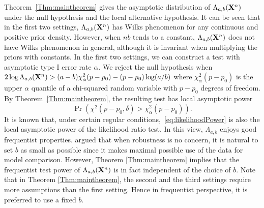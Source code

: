 \documentclass[11pt]{article}
\theoremstyle{plain}
\theoremstyle{definition}
\theoremstyle{remark}
\begin{document}
Theorem~\ref{Thm:maintheorem} gives the asymptotic distribution of $\Lambda_{a,b} (\mathbf{X}^n)$ under the null hypothesis and the local alternative hypothesis.
It can be seen that in the first two settings, $\Lambda_{a,b}(\mathbf{X}^n)$ has Wilks phenomenon for any continuous and positive prior density.
However, when $nb$ tends to a constant, $\Lambda_{a,b}(\mathbf{X}^n)$ does not have Wilks phenomenon in general, although it is invariant when multiplying the priors with constants.
In the first two settings, we can construct a test with asymptotic type I error rate $\alpha$.
We reject the null hypothesis when $ 2\log \Lambda_{a,b} (\mathbf{X}^n)>(a-b)\chi^2_{\alpha}(p-p_0)-(p-p_0)\log (a/b) $ where $\chi^2_{\alpha}(p-p_0)$ is the upper $\alpha$ quantile of a chi-squared random variable with $p-p_0$ degrees of freedom.
By Theorem~\ref{Thm:maintheorem}, the resulting test has local asymptotic power
\begin{equation}\label{eq:likelihoodPower}
\Pr \left( \chi^2(p-p_0,\delta)> \chi^2_{\alpha}(p-p_0) \right).
\end{equation}
It is known that, under certain regular conditions,~\eqref{eq:likelihoodPower} is also the local asymptotic power of the likelihood ratio test. 
In this view, $\Lambda_{a,b}$ enjoys good frequentist properties.
\cite{Fractional1995} argued that when robustness is no concern, it is natural to set $b$ as small as possible since it makes maximal possible use of the data for model comparison.
However, Theorem \ref{Thm:maintheorem} implies that the frequentist test power of $\Lambda_{a,b}(\mathbf{X}^n)$ is in fact independent of the choice of $b$.
Note that in Theorem \ref{Thm:maintheorem}, the second and the third settings require more assumptions than the first setting.
Hence in frequentist perspective, it is preferred to use a fixed $b$.
\end{document}
